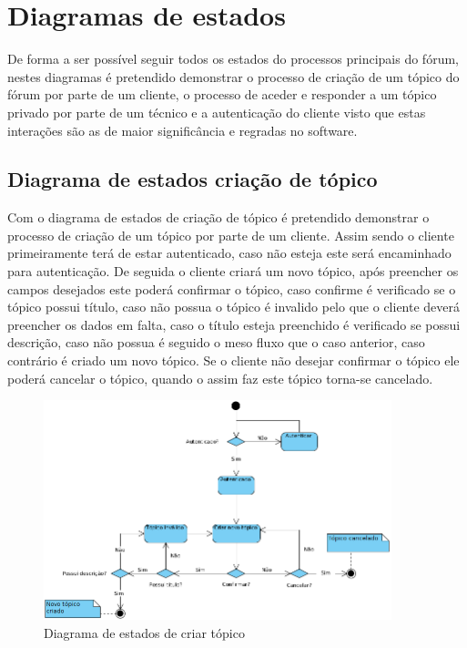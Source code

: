 \newpage

\section{Diagramas de estados}
De forma a ser possível seguir todos os estados do processos principais do fórum, nestes diagramas é pretendido demonstrar o processo de criação de um tópico do fórum por parte de um cliente, o processo de aceder e responder a um tópico privado por parte de um técnico e a autenticação do cliente visto que estas interações são as de maior significância e regradas no software.

\subsection{Diagrama de estados criação de tópico}

Com o diagrama de estados de criação de tópico é pretendido demonstrar o processo de criação de um tópico por parte de um cliente. Assim sendo o cliente primeiramente terá de estar autenticado, caso não esteja este será encaminhado para autenticação. De seguida o cliente criará um novo tópico, após preencher os campos desejados este poderá confirmar o tópico, caso confirme é verificado se o tópico possui título, caso não possua o tópico é invalido pelo que o cliente deverá preencher os dados em falta, caso o título esteja preenchido é verificado se possui descrição, caso não possua é seguido o meso fluxo que o caso anterior, caso contrário é criado um novo tópico. Se o cliente não desejar confirmar o tópico ele poderá cancelar o tópico, quando o assim faz este tópico torna-se cancelado.

\begin{figure}[htb]
    \centering
    \includegraphics[width=0.9\textwidth]{images/diagramas/estados/criar_topico.png}
    \caption{Diagrama de estados de criar tópico}
    \label{fig:27}
\end{figure}

